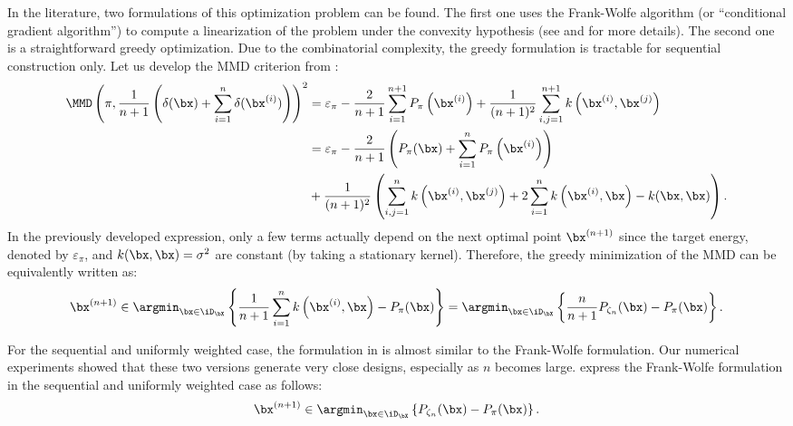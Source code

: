 In the literature, two formulations of this optimization problem can be found. 
The first one uses the Frank-Wolfe algorithm (or ``conditional gradient algorithm'') to compute a linearization of the problem under the convexity hypothesis (see \citealp{lacoste_2015} and \citealp{briol_2015} for more details). 
The second one is a straightforward greedy optimization. Due to the combinatorial complexity, the greedy formulation is tractable for sequential construction only. 
Let us develop the MMD criterion from :
\begin{subequations}
\begin{align}
    \MMD\left(\pi, \frac{1}{n+1} \left(\delta(\bx) + \sum_{i=1}^{n} \delta(\bx^{(i)})\right)\right)^2
    &= \varepsilon_\pi - \frac{2}{n+1} \sum_{i=1}^{n+1} P_{\pi}\left(\bx^{(i)}\right) + \frac{1}{(n+1)^2} \sum_{i,j=1}^{n+1} k\left(\bx^{(i)}, \bx^{(j)}\right)\\
    &= \varepsilon_\pi - \frac{2}{n+1} \left(P_\pi(\bx) + \sum_{i=1}^n P_{\pi}\left(\bx^{(i)}\right)\right)\\ &+ \frac{1}{(n+1)^2} \left(\sum_{i,j=1}^n k\left(\bx^{(i)}, \bx^{(j)}\right) + 2\sum_{i=1}^n k\left(\bx^{(i)}, \bx\right) - k(\bx, \bx) \right).
\end{align}
\end{subequations}
In the previously developed expression, only a few terms actually depend on the next optimal point $\bx^{(n+1)}$ since the target energy, denoted by $\varepsilon_\pi$, and $k(\bx, \bx)=\sigma^2$ are constant (by taking a stationary kernel). 
Therefore, the greedy minimization of the MMD can be equivalently written as: 
\begin{equation}
    \bx^{(n+1)} \in \argmin_{\bx \in \iD_{\bX}} \left\{ \frac{1}{n+1} \sum_{i=1}^n k\left(\bx^{(i)}, \bx\right) - P_\pi(\bx) \right\} = \argmin_{\bx \in \iD_{\bX}} \left\{ \frac{n}{n+1} P_{\zeta_n}(\bx) - P_{\pi}(\bx)\right\}.
    \label{eq:greedy_formulation}
\end{equation}

\medskip
\begin{remark}
For the sequential and uniformly weighted case, the formulation in  is almost similar to the Frank-Wolfe formulation. 
Our numerical experiments showed that these two versions generate very close designs, especially as $n$ becomes large. 
\cite{pronzato_rendas_2021} express the Frank-Wolfe formulation in the sequential and uniformly weighted case as follows:
\begin{align}
   \bx^{(n+1)} \in \argmin_{\bx \in \iD_{\bX}} \left\{P_{\zeta_n}(\bx) - P_{\pi}(\bx)\right\}.
   \label{eq:kh_criterion}
\end{align}
\end{remark}
\smallskip

